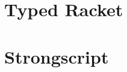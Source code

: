 \documentclass{report}
\begin{document}
\section{Typed Racket}
\section{Strongscript}
\end{document}
